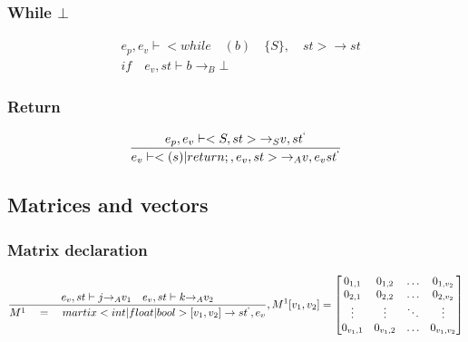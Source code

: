 \subsubsection{While $\bot$}
\begin{align*}
	&{ e }_{ p },{ e }_{ v }\vdash <while\quad (b)\quad \{S\},\quad st>\rightarrow st\\
	&if\quad { e }_{ v },st\vdash b{ \rightarrow  }_{ B }\bot
\end{align*}

\subsubsection{Return}
\begin{equation}
	\frac { { e }_{ p },{ e }_{ v }\vdash <{ S },st>{ \rightarrow  }_{ S }v,{ st }^{ ` } }{ { e }_{ v }\vdash <(s)|return;,{ e }_{ v },st>{ \rightarrow  }_{ A }v,{ e }_{ v }{ st }^{ ` } } 
\end{equation}


\subsection*{Matrices and vectors} 
\subsubsection{Matrix declaration}
\begin{equation}
	\frac { { e }_{ v },st\vdash j{ \rightarrow  }_{ A }{ v }_{ 1 }\quad { e }_{ v },st\vdash k{ \rightarrow  }_{ A }{ v }_{ 2 } }{ { M }^{ 1 }\quad =\quad martix<int|float|bool>[{ v }_{ 1 },{ v }_{ 2 }]\rightarrow { st }^{ ` },{ e }_{ v } } ,{ M }^{ 1 }[{ v }_{ 1 },{ v }_{ 2 }]=\begin{bmatrix} { { 0 }_{ 1,1 } }& 0_{1,2} & \dots  & { 0 }_{ { 1,{ v }_{ 2 } } } \\ 0_{2,1} & 0_{2,2} & \dots  & 0_{2,v_{2}}  \\ \vdots & \vdots & \ddots & \vdots \\ { 0 }_{ { v }_{ 1 },1 } & 0_{v_1,2} & \dots & { 0 }_{ { v }_{ 1 },{ v }_{ 2 } } \end{bmatrix}
\end{equation}

